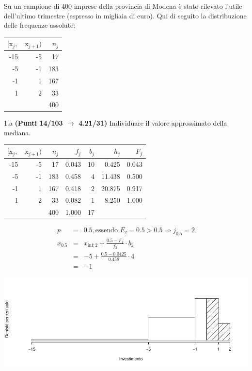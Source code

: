 \documentclass[
  11pt,
]{book}
\theoremstyle{mytheoremstyle}
\theoremstyle{mydefstyle}
\newenvironment{sol}
  {
  \begin{tcolorbox}[enhanced,breakable,arc=0.1mm,boxrule=1pt,colback=white,colframe=iblue,
  title=\bf \fontfamily{lmss}\selectfont \hspace{.5 cm} Soluzione,drop fuzzy shadow]

}{
\end{tcolorbox}
  }
\begin{document}
Su un campione di \(400\) imprese della provincia di Modena è stato rilevato l'utile dell'ultimo trimestre (espresso in migliaia di euro). Qui di seguito la distribuzione delle frequenze assolute:

\begin{table}[H]
\centering
\begin{tabular}{rrr}
\toprule
$[\text{x}_j,$ & $\text{x}_{j+1})$ & $n_j$\\
\midrule
-15 & -5 & 17\\
-5 & -1 & 183\\
-1 & 1 & 167\\
1 & 2 & 33\\
 &  & 400\\
\bottomrule
\end{tabular}
\end{table}

1.a \textbf{(Punti 14/103 \(\rightarrow\) 4.21/31)} Individuare il valore approssimato della mediana.

\begin{sol}

\begin{table}[H]
\centering
\begin{tabular}{rrrrrrr}
\toprule
$[\text{x}_j,$ & $\text{x}_{j+1})$ & $n_j$ & $f_j$ & $b_j$ & $h_j$ & $F_j$\\
\midrule
-15 & -5 & 17 & 0.043 & 10 & 0.425 & 0.043\\
-5 & -1 & 183 & 0.458 & 4 & 11.438 & 0.500\\
-1 & 1 & 167 & 0.418 & 2 & 20.875 & 0.917\\
1 & 2 & 33 & 0.082 & 1 & 8.250 & 1.000\\
 &  & 400 & 1.000 & 17 &  & \\
\bottomrule
\end{tabular}
\end{table}

\begin{eqnarray*}
  p &=&  0.5 , \text{essendo }F_{ 2 }= 0.5  > 0.5  \Rightarrow j_{ 0.5 }= 2 \\
  x_{ 0.5 } &=& x_{\text{inf}; 2 } + \frac{ { 0.5 } - F_{ 1 }} {f_{ 2 }} \cdot b_{ 2 } \\
            &=&  -5  + \frac {{ 0.5 } -  0.0425 } { 0.458 } \cdot  4  \\
            &=&  -1 
\end{eqnarray*}

\begin{center}\includegraphics{Esami_passati_con_soluzioni_files/figure-latex/2023-20,-1} \end{center}

\end{sol}
\end{document}
